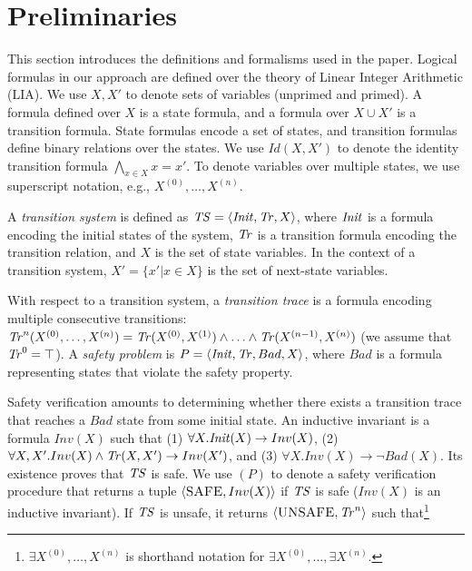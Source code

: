 \section{Preliminaries}
\label{Sec:Preliminaries}
This section introduces the definitions and formalisms used in the paper. 
Logical formulas in our approach are defined over the theory of Linear Integer Arithmetic (LIA).
We use $X,X'$ to denote sets of variables (unprimed and primed).
A formula defined over $X$ is a state formula, and a formula over $X \cup X'$ is a transition formula.
State formulas encode a set of states, and transition formulas define binary relations over the states.
We use $Id(X,X')$ to denote the identity transition formula $\bigwedge_{x \in X} x = x'$.
To denote variables over multiple states, we use superscript notation, e.g., $X^{(0)}, \ldots, X^{(n)}$.


A \emph{transition system} is defined as $\mathit{TS} = \langle  \mathit{Init}, \mathit{Tr}, X  \rangle$, where $\mathit{Init}$ is a formula 
encoding the initial states of the system, $\mathit{Tr}$ is a transition formula encoding the transition
relation, and $X$ is the set of state variables.
In the context of a transition system, $X'= \{x'| x \in X\}$ is the set of next-state variables.

With respect to a transition system, a \emph{transition trace} is a formula encoding multiple consecutive 
transitions: $\mathit{Tr}^{n}(X^{(0)}, \ldots, X^{(n)}) = \mathit{Tr}(X^{(0)}, X^{(1)}) \land \ldots \land \mathit{Tr}(X^{(n-1)}, X^{(n)})$
(we assume that $\mathit{Tr}^{0} = \top$).
A \emph{safety problem} is $P = \langle  \mathit{Init}, \mathit{Tr}, Bad, X  \rangle$, where $Bad$ is a formula representing 
states that violate the safety property.

%

Safety verification amounts to determining whether there exists a transition trace that reaches a $Bad$ state from some initial state.
An inductive invariant is a formula $Inv(X)$ such that (1) $\forall X. \mathit{Init}(X) \rightarrow Inv(X)$, 
(2) $\forall X, X'. Inv(X) \land \mathit{Tr}(X,X') \rightarrow Inv(X')$, and (3) $\forall X. Inv(X) \rightarrow \lnot Bad(X)$.
Its existence proves that $\mathit{TS}$ is safe.
We use \safetyCheck$(P)$ to denote a safety verification procedure that returns a tuple $\langle \textsc{SAFE}, Inv(X) \rangle$ if 
$\mathit{TS}$ is safe ($Inv(X)$ is an inductive invariant).
If $\mathit{TS}$ is unsafe, it returns $\langle \textsc{UNSAFE}, \mathit{Tr}^{n} \rangle$ such that\footnote{$\exists X^{(0)}, \ldots, X^{(n)}$ is shorthand notation for $\exists  X^{(0)}, \ldots, \exists X^{(n)}$.}

